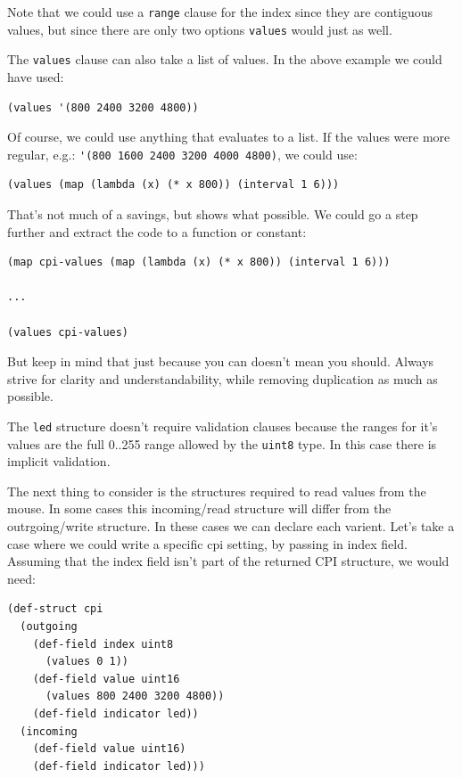 \documentclass[12pt]{article}
\begin{document}
Note that we could use a \verb|range| clause for the index since they
are contiguous values, but since there are only two options
\verb|values| would just as well.

The \verb|values| clause can also take a list of values. In the above
example we could have used:

\begin{verbatim}
(values '(800 2400 3200 4800))  
\end{verbatim}

Of course, we could use anything that evaluates to a list. If the
values were more regular, e.g.:
\verb|'(800 1600 2400 3200 4000 4800)|, we could use:

\begin{verbatim}
(values (map (lambda (x) (* x 800)) (interval 1 6)))
\end{verbatim}

That's not much of a savings, but shows what possible. We could go a
step further and extract the code to a function or constant:

\begin{verbatim}
(map cpi-values (map (lambda (x) (* x 800)) (interval 1 6)))

...

(values cpi-values)
\end{verbatim}

But keep in mind that just because you can doesn't mean you should.
Always strive for clarity and understandability, while removing
duplication as much as possible.

The \verb|led| structure doesn't require validation clauses because
the ranges for it's values are the full 0..255 range allowed by the
\verb|uint8| type. In this case there is implicit validation.

The next thing to consider is the structures required to read values
from the mouse. In some cases this incoming/read structure will differ
from the outrgoing/write structure. In these cases we can declare each
varient. Let's take a case where we could write a specific cpi
setting, by passing in index field. Assuming that the index field
isn't part of the returned CPI structure, we would need:

\begin{verbatim}
(def-struct cpi
  (outgoing
    (def-field index uint8
      (values 0 1))
    (def-field value uint16
      (values 800 2400 3200 4800))
    (def-field indicator led))
  (incoming
    (def-field value uint16)
    (def-field indicator led)))
\end{verbatim}
\end{document}

